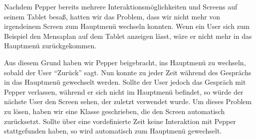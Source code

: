 Nachdem Pepper bereits mehrere Interaktionsmöglichkeiten und Screens auf seinem Tablet besaß, hatten wir das Problem, dass wir nicht mehr von 
irgendeinem Screen zum Hauptmenü wechseln konnten. Wenn ein User sich zum Beispiel den Mensaplan auf dem Tablet anzeigen lässt, wäre er nicht 
mehr in das Hauptmenü zurückgekommen. 

Aus diesem Grund haben wir Pepper beigebracht, ins Hauptmenü zu wechseln, sobald der User ``Zurück'' sagt. Nun konnte zu jeder Zeit 
während des Gesprächs in das Hauptmenü gewechselt werden. Sollte der User jedoch das Gespräch mit Pepper verlassen, während er sich nicht im 
Hauptmenü befindet, so würde der nächste User den Screen sehen, der zuletzt verwendet wurde. 
Um dieses Problem zu lösen, haben wir eine Klasse geschrieben, die den Screen automatisch zurücksetzt.
Sollte über eine vordefinierte Zeit keine Interaktion mit Pepper stattgefunden haben, so wird automatisch zum Hauptmenü gewechselt.